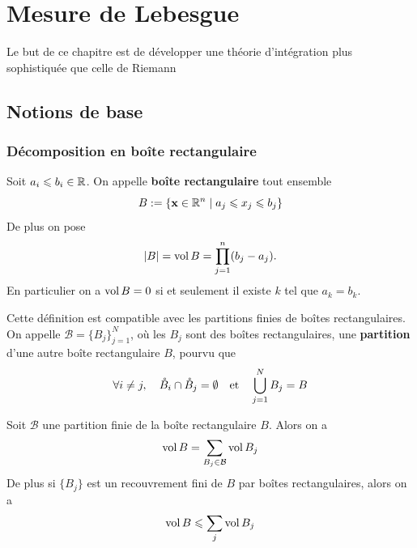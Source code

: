 \chapter{Mesure de Lebesgue}
Le but de ce chapitre est de développer une théorie d'intégration plus sophistiquée que celle de Riemann

\section{Notions de base}

\subsection{Décomposition en boîte rectangulaire}

\begin{definition} \label{def: Boîte rectangulaire}
	Soit $a_i \leqslant b_i \in \mathbb{R}$. On appelle \textbf{boîte rectangulaire} tout ensemble
	\[
	B := \{ \mathbf{x} \in \mathbb{R}^n \mid a_j \leqslant x_j \leqslant b_j\}
	\]
	De plus on pose
	\[
	|B| = \operatorname{vol} B = \prod_{j=1}^n (b_j - a_j).
	\]
	En particulier on a $\operatorname{vol} B = 0$ si et seulement il existe $k$ tel que $a_k = b_k$.
\end{definition}

Cette définition est compatible avec les partitions finies de boîtes rectangulaires. On appelle $\mathcal B = \{B_j\}_{j=1}^N$, où les $B_j$ sont des boîtes rectangulaires, une \textbf{partition} d'une autre boîte rectangulaire $B$, pourvu que
\[
\forall i\neq j, \quad \mathring B_i \cap \mathring B_j = \emptyset \quad \text{et} \quad \bigcup_{j=1}^N B_j = B
\]
\begin{proposition} \label{prop: partition de boîte}
	Soit $\mathcal B$ une partition finie de la boîte rectangulaire $B$. Alors on a
	\[
	\operatorname{vol} B = \sum_{B_j \in \mathcal B} \operatorname{vol} B_j
	\]
	De plus si $\{B_j\}$ est un recouvrement fini de $B$ par boîtes rectangulaires, alors on a
	\[
	\operatorname{vol} B \leqslant \sum_j \operatorname{vol} B_j
	\]
\end{proposition}


